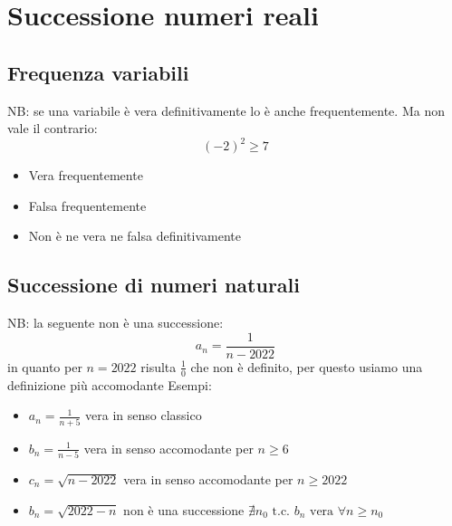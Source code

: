 \section{Successione numeri reali}
\subsection{Frequenza variabili}

NB: se una variabile è vera definitivamente lo è anche frequentemente. Ma non vale il contrario: \[
\left( -2 \right) ^2 \ge 7
\] 
\begin{itemize}
	\item Vera frequentemente
	\item Falsa frequentemente
	\item Non è ne vera ne falsa definitivamente
\end{itemize}
\subsection{Successione di numeri naturali}
NB: la seguente non è una successione:
\[
a_n = \frac{1}{n-2022}
\] 
in quanto per $n=2022$ risulta $\frac{1}{0}$ che non è definito, per questo usiamo una definizione più accomodante
Esempi:
\begin{itemize}
	\item $a_n = \frac{1}{n+5}$ \quad vera in senso classico
	\item $b_n= \frac{1}{n-5}$ \quad vera in senso accomodante per $n\ge 6$
	\item $c_n= \sqrt{n-2022} $ \quad vera in senso accomodante per $n \ge 2022$
	\item $b_n= \sqrt{2022-n} $ \quad non è una successione \rarr $\nexists n_0 \text{ t.c. }b_n \text{ vera } \forall n \ge n_0$
\end{itemize}
